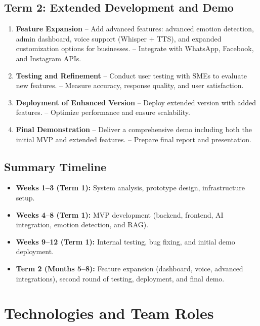 \documentclass[20pt,a4paper]{article}
\begin{document}
\subsection*{Term 2: Extended Development and Demo}
\begin{enumerate}[leftmargin=*]
    \item \textbf{Feature Expansion}  
    -- Add advanced features: advanced emotion detection, admin dashboard, voice support (Whisper + TTS), and expanded customization options for businesses.  
    -- Integrate with WhatsApp, Facebook, and Instagram APIs.  

    \item \textbf{Testing and Refinement}  
    -- Conduct user testing with SMEs to evaluate new features.  
    -- Measure accuracy, response quality, and user satisfaction.  

    \item \textbf{Deployment of Enhanced Version}  
    -- Deploy extended version with added features.  
    -- Optimize performance and ensure scalability.  

    \item \textbf{Final Demonstration}  
    -- Deliver a comprehensive demo including both the initial MVP and extended features.  
    -- Prepare final report and presentation.  
\end{enumerate}

\subsection*{Summary Timeline}
\begin{itemize}[leftmargin=*]
    \item \textbf{Weeks 1--3 (Term 1):} System analysis, prototype design, infrastructure setup.  
    \item \textbf{Weeks 4--8 (Term 1):} MVP development (backend, frontend, AI integration, emotion detection, and RAG).  
    \item \textbf{Weeks 9--12 (Term 1):} Internal testing, bug fixing, and initial demo deployment.  
    \item \textbf{Term 2 (Months 5--8):} Feature expansion (dashboard, voice, advanced integrations), second round of testing, deployment, and final demo.  
\end{itemize}



\section{Technologies and Team Roles}
\end{document}
